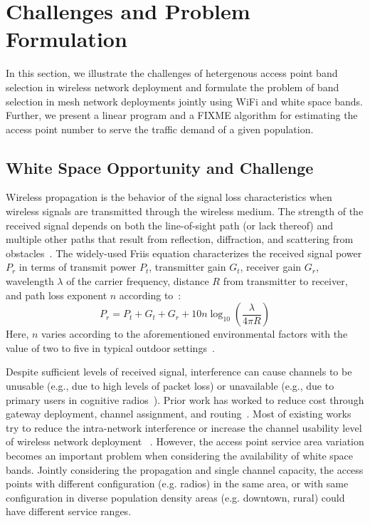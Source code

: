 \section{Challenges and Problem Formulation}
\label{sec:problemformulation}

In this section, we illustrate the challenges of hetergenous access point 
band selection in wireless network deployment and formulate the problem of band 
selection in mesh network deployments jointly using WiFi and white space bands. 
Further, we present a linear program and a FIXME algorithm for estimating the 
access point number to serve the traffic demand of a given population.
 
\subsection{White Space Opportunity and Challenge}
\label{subsec:motivation}

Wireless propagation is the behavior of the signal loss characteristics 
when wireless signals are transmitted through the wireless medium.
The strength of the received signal depends on both the line-of-sight
path (or lack thereof) and multiple other paths that result from 
reflection, diffraction, and scattering from 
obstacles~\cite{andersen1995propagation}. The widely-used Friis
equation characterizes the received signal power $P_r$ in terms 
of transmit power $P_t$, transmitter gain $G_t$, receiver gain $G_r$, 
wavelength $\lambda$ of the carrier frequency, 
distance $R$ from transmitter to receiver, and path loss exponent 
$n$ according to~\cite{friis}:
\begin{equation}
\label{eq:friis}
P_r=P_t+G_t+G_r+10n \log_{10}\left( \frac{\lambda}{4\pi R}\right)
\end{equation}
Here, $n$ varies according to the aforementioned environmental 
factors with the value of two to five in typical outdoor 
settings~\cite{rappaport}.

Despite sufficient levels of received signal, interference can cause channels
to be unusable (e.g., due to high levels of packet loss) or unavailable (e.g.,
due to primary users in cognitive radios~\cite{haykin2005cognitive}).
Prior work has worked to reduce cost through gateway deployment, channel 
assignment, and routing~\cite{he2008optimizing,tang2005interference}.
Most of existing works try to reduce the intra-network interference or increase
the channel usability level of wireless network deployment
~\cite{si2010overview,joshi2009efficient}. However, the access point service area
variation becomes an important problem when considering the availability of white space bands.  
Jointly considering the propagation and single channel capacity, the access points 
with different configuration (e.g. radios) in the same area, or with same configuration 
in diverse population density areas (e.g. downtown, rural) could have different service ranges.


